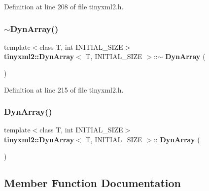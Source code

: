 Definition at line 208 of file tinyxml2.\+h.

\mbox{\label{classtinyxml2_1_1_dyn_array_a4a6aefdca7fe0d3f4068e31870a5adee}} 
\subsubsection{$\sim$\+Dyn\+Array()}
{\footnotesize\ttfamily template$<$class T, int I\+N\+I\+T\+I\+A\+L\+\_\+\+S\+I\+ZE$>$ \\
\textbf{ tinyxml2\+::\+Dyn\+Array}$<$ T, I\+N\+I\+T\+I\+A\+L\+\_\+\+S\+I\+ZE $>$\+::$\sim$\textbf{ Dyn\+Array} (\begin{DoxyParamCaption}{ }\end{DoxyParamCaption})\hspace{0.3cm}{\ttfamily [inline]}}



Definition at line 215 of file tinyxml2.\+h.

\mbox{\label{classtinyxml2_1_1_dyn_array_a8e2251588f079f2e7a4080b2c53dabea}} 
\subsubsection{Dyn\+Array()\hspace{0.1cm}{\footnotesize\ttfamily [2/2]}}
{\footnotesize\ttfamily template$<$class T, int I\+N\+I\+T\+I\+A\+L\+\_\+\+S\+I\+ZE$>$ \\
\textbf{ tinyxml2\+::\+Dyn\+Array}$<$ T, I\+N\+I\+T\+I\+A\+L\+\_\+\+S\+I\+ZE $>$\+::\textbf{ Dyn\+Array} (\begin{DoxyParamCaption}\item[{const \textbf{ Dyn\+Array}$<$ T, I\+N\+I\+T\+I\+A\+L\+\_\+\+S\+I\+ZE $>$ \&}]{ }\end{DoxyParamCaption})\hspace{0.3cm}{\ttfamily [private]}}



\subsection{Member Function Documentation}
\mbox{\label{classtinyxml2_1_1_dyn_array_a8e101fdf5b4248ac119d7dca6d0f5421}} 
